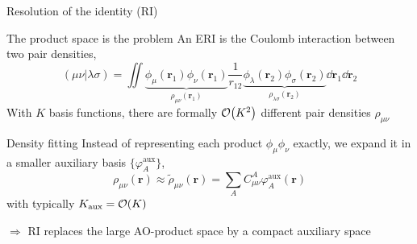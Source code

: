 \documentclass[aspectratio=169,9pt]{beamer}
\newcommand{\br}{\boldsymbol{r}}
\newcommand{\rbraket}[2]{( #1 | #2 )}
\begin{document}

\begin{frame}{Resolution of the identity (RI)}
	\begin{block}{The product space is the problem}
		An ERI is the Coulomb interaction between two \alert{pair densities},
		\begin{equation*}
			\rbraket{\mu\nu}{\lambda\sigma}
			=
			\iint
			\underbrace{\phi_\mu(\br_1)\phi_\nu(\br_1)}_{\rho_{\mu\nu}(\br_1)}
			\frac{1}{r_{12}}
			\underbrace{\phi_\lambda(\br_2)\phi_\sigma(\br_2)}_{\rho_{\lambda\sigma}(\br_2)}
			\dd{\br_1}\dd{\br_2}
		\end{equation*}
		With $K$ basis functions, there are formally $\order{K^2}$
		different pair densities $\rho_{\mu\nu}$
	\end{block}
	\vfill
	\begin{block}{Density fitting}
		Instead of representing each product $\phi_\mu\phi_\nu$ exactly,
		we expand it in a smaller \alert{auxiliary basis} $\{\varphi_A^\text{aux}\}$,
		\begin{equation*}
			\boxed{
				\rho_{\mu\nu}(\br)
				\approx
				\widetilde{\rho}_{\mu\nu}(\br)
				=
				\sum_A C_{\mu\nu}^{A}
				\varphi_A^\text{aux}(\br)
			}
		\end{equation*}
		with typically $K_\text{aux} = \order{K}$
	\end{block}
	\vfill
	\centering
	$\Rightarrow$
	\alert{RI replaces the large AO-product space by a compact auxiliary space}
\end{frame}


\end{document}
